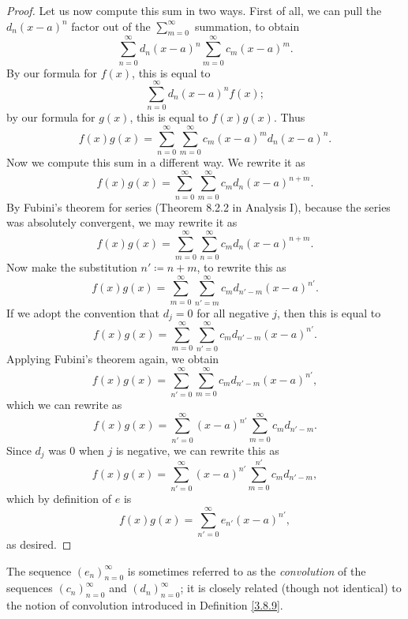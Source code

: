 \begin{proof}
    Let us now compute this sum in two ways.
    First of all, we can pull the \(d_n (x - a)^n\) factor out of the \(\sum_{m = 0}^\infty\) summation, to obtain
    \[
        \sum_{n = 0}^\infty d_n (x - a)^n \sum_{m = 0}^\infty c_m (x - a)^m.
    \]
    By our formula for \(f(x)\), this is equal to
    \[
        \sum_{n = 0}^\infty d_n (x - a)^n f(x);
    \]
    by our formula for \(g(x)\), this is equal to \(f(x) g(x)\).
    Thus
    \[
        f(x) g(x) = \sum_{n = 0}^\infty \sum_{m = 0}^\infty c_m (x - a)^m d_n (x - a)^n.
    \]
    Now we compute this sum in a different way.
    We rewrite it as
    \[
        f(x) g(x) = \sum_{n = 0}^\infty \sum_{m = 0}^\infty c_m d_n (x - a)^{n + m}.
    \]
    By Fubini's theorem for series (Theorem 8.2.2 in Analysis I), because the series was absolutely convergent, we may rewrite it as
    \[
        f(x) g(x) = \sum_{m = 0}^\infty \sum_{n = 0}^\infty c_m d_n (x - a)^{n + m}.
    \]
    Now make the substitution \(n' \coloneqq n + m\), to rewrite this as
    \[
        f(x) g(x) = \sum_{m = 0}^\infty \sum_{n' = m}^\infty c_m d_{n' - m} (x - a)^{n'}.
    \]
    If we adopt the convention that \(d_j = 0\) for all negative \(j\), then this is equal to
    \[
        f(x) g(x) = \sum_{m = 0}^\infty \sum_{n' = 0}^\infty c_m d_{n' - m} (x - a)^{n'}.
    \]
    Applying Fubini's theorem again, we obtain
    \[
        f(x) g(x) = \sum_{n' = 0}^\infty \sum_{m = 0}^\infty c_m d_{n' - m} (x - a)^{n'},
    \]
    which we can rewrite as
    \[
        f(x) g(x) = \sum_{n' = 0}^\infty (x - a)^{n'} \sum_{m = 0}^\infty c_m d_{n' - m}.
    \]
    Since \(d_j\) was \(0\) when \(j\) is negative, we can rewrite this as
    \[
        f(x) g(x) = \sum_{n' = 0}^\infty (x - a)^{n'} \sum_{m = 0}^{n'} c_m d_{n' - m},
    \]
    which by definition of \(e\) is
    \[
        f(x) g(x) = \sum_{n' = 0}^\infty e_{n'} (x - a)^{n'},
    \]
    as desired.
\end{proof}

\begin{remark}\label{4.4.2}
    The sequence \((e_n)_{n = 0}^\infty\) is sometimes referred to as the \emph{convolution} of the sequences \((c_n)_{n = 0}^\infty\) and \((d_n)_{n = 0}^\infty\);
    it is closely related (though not identical) to the notion of convolution introduced in Definition \ref{3.8.9}.
\end{remark}